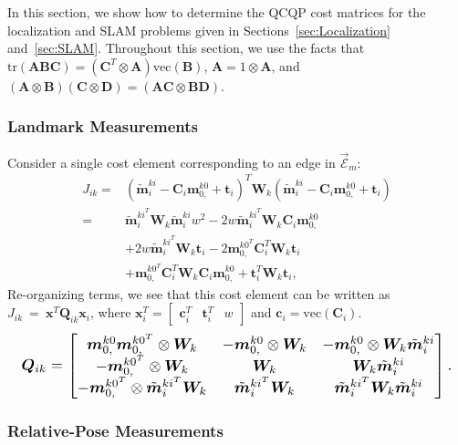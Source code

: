 \documentclass[lettersize,journal]{IEEEtran}
\newcommand{\EdgeSet}{\vec{\bm{\mathcal{E}}}}
\newcommand{\vect}[1]{\mbox{vec}(#1)}
\newcommand{\tr}[1]{\mbox{tr}\left(#1\right)}
\begin{document}
In this section, we show how to determine the QCQP cost matrices for the localization and SLAM problems given in Sections~\ref{sec:Localization} and~\ref{sec:SLAM}. Throughout this section, we use the facts that $ \tr{\bm{A}\bm{B}\bm{C}} = (\bm{C}^T\otimes\bm{A}) \vect{\bm{B}}$, $ \bm{A} = 1\otimes\bm{A} $, and $ (\bm{A}\otimes\bm{B})(\bm{C}\otimes\bm{D}) = (\bm{AC}\otimes\bm{BD}) $\cite{magnusMatrixDifferentialCalculus2019}. 

\subsubsection{Landmark Measurements}

Consider a single cost element corresponding to an edge in $\EdgeSet_m $:
\begin{align*}
	J_{ik}=&(\tilde{\bm{m}}_i^{ki} - \bm{C}_i\bm{m}_{0,}^{k0} + \bm{t}_i)^T \bm{W}_k (\tilde{\bm{m}}_i^{ki} - \bm{C}_i\bm{m}_{0,}^{k0} + \bm{t}_i) \\
	=& \tilde{\bm{m}}_i^{ki^T}\bm{W}_k\tilde{\bm{m}}_i^{ki} w^2 - 2 w\tilde{\bm{m}}_i^{ki^T}\bm{W}_k\bm{C}_i\bm{m}_{0,}^{k0}  \\
	&+ 2 w\tilde{\bm{m}}_i^{ki^T}\bm{W}_k\bm{t}_i -2\bm{m}_{0,}^{k0^T}\bm{C}_i^T\bm{W}_k\bm{t}_i\\
	& + \bm{m}_{0,}^{k0^T}\bm{C}_i^T\bm{W}_k\bm{C}_i\bm{m}_{0,}^{k0} + \bm{t}_i^T\bm{W}_k\bm{t}_i,
\end{align*}
Re-organizing terms, we see that this cost element can be written as $J_{ik}~=~\bm{x}^T\bm{Q}_{ik}\bm{x}_i$, where $ \bm{x}_i^T = \begin{bmatrix} \bm{c}_i^T &  \bm{t}_i^T & w \end{bmatrix} $ and $ \bm{c}_i=\vect{\bm{C}_i} $.
\begin{equation*}
	\resizebox{0.98\columnwidth}{!}{$\bm{Q}_{ik}=\begin{bmatrix}
			\bm{m}_{0,}^{k0}\bm{m}_{0,}^{k0^T} \otimes \bm{W}_k  & -\bm{m}_{0,}^{k0}\otimes\bm{W}_k & -\bm{m}_{0,}^{k0}\otimes\bm{W}_k\tilde{\bm{m}}_i^{ki}\\
			 -\bm{m}_{0,}^{k0^T}\otimes\bm{W}_k & \bm{W}_k & \bm{W}_k\tilde{\bm{m}}_i^{ki} \\
			-\bm{m}_{0,}^{k0^T}\otimes\tilde{\bm{m}}_i^{ki^T}\bm{W}_k & \tilde{\bm{m}}_i^{ki^T}\bm{W}_k & \tilde{\bm{m}}_i^{ki^T}\bm{W}_k\tilde{\bm{m}}_i^{ki}
		\end{bmatrix}.$}
\end{equation*}

\subsubsection{Relative-Pose Measurements}
\end{document}
